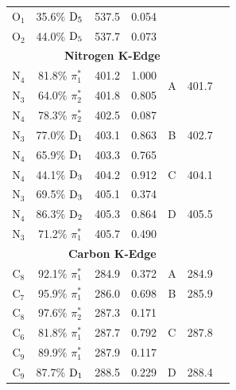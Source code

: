 \documentclass[12pt]{article}
\begin{document}
\begin{table}[!t]
\begin{tabular*}{8.5cm}{@{\extracolsep{\fill} }cccrccc}
    O$_1$
 &   35.6$\%$ $\rm D_5$  & 537.5 & 0.054 \\
    O$_2$
 &   44.0$\%$ $\rm D_5$  & 537.7 & 0.073 \vspace{0.05in}\\
  \multicolumn{6}{c}{\textbf{Nitrogen K-Edge}} \vspace{0.05in}\\
     N$_4$
 &   81.8$\%$ $\pi_1^*$  & 401.2 & 1.000 & \multirow{2}{*}{A} & \multirow{2}{*}{401.7} \\
    N$_3$
 &   64.0$\%$ $\pi_2^*$  & 401.8 & 0.805 
 \vspace{0.05in}\\
    N$_4$
 &   78.3$\%$ $\pi_2^*$  & 402.5 & 0.087 & \multirow{3}{*}{B} & \multirow{3}{*}{402.7}\\
    N$_3$
 &   77.0$\%$ $\rm D_1$  & 403.1 & 0.863 \\
    N$_4$
 &   65.9$\%$ $\rm D_1$  & 403.3 & 0.765 
 \vspace{0.05in}\\
    N$_4$
 &   44.1$\%$ $\rm D_3$  & 404.2 & 0.912 & C & 404.1 
 \vspace{0.05in}\\
    N$_3$
 &   69.5$\%$ $\rm D_3$  & 405.1 & 0.374  & \multirow{3}{*}{D} & \multirow{3}{*}{405.5} \\
    N$_4$
 &   86.3$\%$ $\rm D_2$  & 405.3 & 0.864 \\
    N$_3$
 &   71.2$\%$ $\pi_1^*$  & 405.7 & 0.490 \vspace{0.05in}\\
   \multicolumn{6}{c}{\textbf{Carbon K-Edge}} \vspace{0.05in}\\
       C$_8$
 &   92.1$\%$ $\pi_1^*$  & 284.9 & 0.372 & A & 284.9  
 \vspace{0.05in} \\
    C$_7$
 &   95.9$\%$ $\pi_1^*$  & 286.0 & 0.698 & B & 285.9
 \vspace{0.05in} \\
    C$_8$
 &   97.6$\%$ $\pi_2^*$  & 287.3 & 0.171   & \multirow{3}{*}{C} & \multirow{3}{*}{287.8}  \\
    C$_6$
 &   81.8$\%$ $\pi_1^*$  & 287.7 & 0.792 \\
    C$_9$
 &   89.9$\%$ $\pi_1^*$  & 287.9 & 0.117  
 \vspace{0.05in}  \\
     C$_9$ &   87.7$\%$ $\rm D_1$  & 288.5 & 0.229 & D & 288.4
  \vspace{0.05in}  \\

\end{tabular*}
\end{table}
\end{document}
